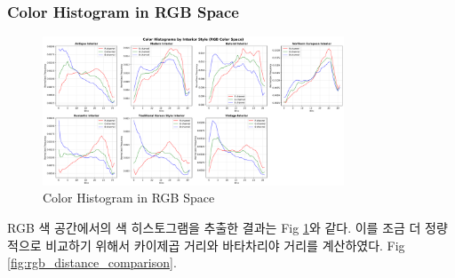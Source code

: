\documentclass[11pt]{article}
\begin{document}
\subsubsection{Color Histogram in RGB Space}
\begin{figure}[htbp]
    \centering
    \includegraphics[width=0.8\textwidth]{figures/rgb_color_histogram.pdf}
    \caption{Color Histogram in RGB Space}
    \label{fig:rgb_color_histogram}
\end{figure}
RGB 색 공간에서의 색 히스토그램을 추출한 결과는 Fig \ref{fig:rgb_color_histogram}와 같다. 이를 조금 더 정량적으로 비교하기 위해서 카이제곱 거리와 바타차리야 거리를 계산하였다. Fig \ref{fig:rgb_distance_comparison}.
\end{document}
